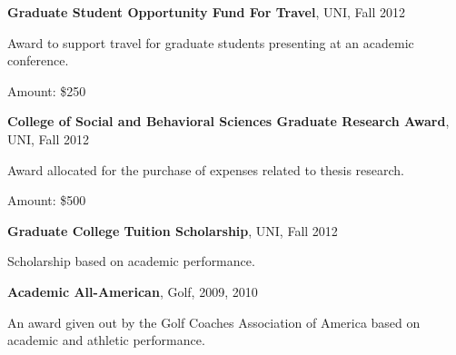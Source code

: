 \documentclass[letterpaper,10pt]{article}
\newlength{\outerbordwidth}
\newcommand{\resheading}[1]{\vspace{8pt}
  \parbox{\textwidth}{\setlength{\FrameSep}{\outerbordwidth}
    \begin{shaded}
\setlength{\fboxsep}{0pt}\framebox[\textwidth][l]{\setlength{\fboxsep}{4pt}\fcolorbox{shadecolorB}{shadecolorB}{\textbf{\sffamily{\mbox{~}\makebox[6.762in][l]{\large #1} \vphantom{p\^{E}}}}}}
    \end{shaded}
  }\vspace{-5pt}
}
\begin{document}
\begin{center}
	\parbox{6.5in}{\textbf{Graduate Student Opportunity Fund For Travel}, UNI, Fall 2012}
	\parbox{6.5in}{Award to support travel for graduate students presenting at an academic conference.}
	\parbox{6.5in}{Amount: \$250}
\end{center}
\begin{center}
	\parbox{6.5in}{\textbf{College of Social and Behavioral Sciences Graduate Research Award}, UNI, Fall 2012}
	\parbox{6.5in}{Award allocated for the purchase of expenses related to thesis research.}
	\parbox{6.5in}{Amount: \$500}
\end{center}
\begin{center}
	\parbox{6.5in}{\textbf{Graduate College Tuition Scholarship}, UNI,  Fall 2012}
	\parbox{6.5in}{Scholarship based on academic performance.}
\end{center}
\begin{center}
	\parbox{6.5in}{\textbf{Academic All-American}, Golf, 2009, 2010}
	\parbox{6.5in}{An award given out by the Golf Coaches Association of America based on academic and athletic performance.}
\end{center}


%
\end{document}
